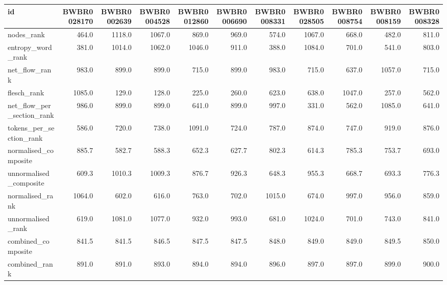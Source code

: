 \begin{tabular}{lrrrrrrrrrr}
\toprule
id & BWBR0028170 & BWBR0002639 & BWBR0004528 & BWBR0012860 & BWBR0006690 & BWBR0008331 & BWBR0028505 & BWBR0008754 & BWBR0008159 & BWBR0008328 \\
\midrule
nodes\_rank & 464.0 & 1118.0 & 1067.0 & 869.0 & 969.0 & 574.0 & 1067.0 & 668.0 & 482.0 & 811.0 \\
\cline{1-11}
entropy\_word\_rank & 381.0 & 1014.0 & 1062.0 & 1046.0 & 911.0 & 388.0 & 1084.0 & 701.0 & 541.0 & 803.0 \\
\cline{1-11}
net\_flow\_rank & 983.0 & 899.0 & 899.0 & 715.0 & 899.0 & 983.0 & 715.0 & 637.0 & 1057.0 & 715.0 \\
\cline{1-11}
flesch\_rank & 1085.0 & 129.0 & 128.0 & 225.0 & 260.0 & 623.0 & 638.0 & 1047.0 & 257.0 & 562.0 \\
\cline{1-11}
net\_flow\_per\_section\_rank & 986.0 & 899.0 & 899.0 & 641.0 & 899.0 & 997.0 & 331.0 & 562.0 & 1085.0 & 641.0 \\
\cline{1-11}
tokens\_per\_section\_rank & 586.0 & 720.0 & 738.0 & 1091.0 & 724.0 & 787.0 & 874.0 & 747.0 & 919.0 & 876.0 \\
\cline{1-11}
normalised\_composite & 885.7 & 582.7 & 588.3 & 652.3 & 627.7 & 802.3 & 614.3 & 785.3 & 753.7 & 693.0 \\
\cline{1-11}
unnormalised\_composite & 609.3 & 1010.3 & 1009.3 & 876.7 & 926.3 & 648.3 & 955.3 & 668.7 & 693.3 & 776.3 \\
\cline{1-11}
normalised\_rank & 1064.0 & 602.0 & 616.0 & 763.0 & 702.0 & 1015.0 & 674.0 & 997.0 & 956.0 & 859.0 \\
\cline{1-11}
unnormalised\_rank & 619.0 & 1081.0 & 1077.0 & 932.0 & 993.0 & 681.0 & 1024.0 & 701.0 & 743.0 & 841.0 \\
\cline{1-11}
combined\_composite & 841.5 & 841.5 & 846.5 & 847.5 & 847.5 & 848.0 & 849.0 & 849.0 & 849.5 & 850.0 \\
\cline{1-11}
combined\_rank & 891.0 & 891.0 & 893.0 & 894.0 & 894.0 & 896.0 & 897.0 & 897.0 & 899.0 & 900.0 \\
\cline{1-11}
\bottomrule
\end{tabular}
